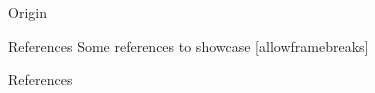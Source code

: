 \documentclass[10pt]{beamer}
\begin{document}
\begin{frame}[fragile]{Origin}

  \citet{Rubin1984}

\end{frame}

\begin{frame}{References}
  Some references to showcase [allowframebreaks] \cite{Marin2012}
\end{frame}


\begin{frame}[allowframebreaks]{References}

  
  

\end{frame}
\end{document}
